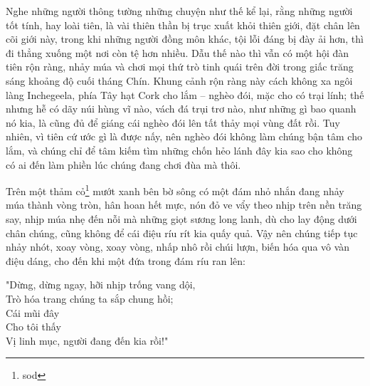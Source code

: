 Nghe những người thông tường những chuyện như thế kể lại, rằng những người tốt tính, hay loài tiên, là vài thiên thần bị trục xuất khỏi thiên giới, đặt chân lên cõi giới này, trong khi những người đồng môn khác, tội lỗi đáng bị đày ải hơn, thì đi thẳng xuống một nơi còn tệ hơn nhiều. Dẫu thế nào thì vẫn có một hội đàn tiên rộn ràng, nhảy múa và chơi mọi thứ trò tinh quái trên đời trong giấc trăng sáng khoảng độ cuối tháng Chín. Khung cảnh rộn ràng này cách không xa ngôi làng Inchegeela, phía Tây hạt Cork cho lắm – nghèo đói, mặc cho có trại lính; thế nhưng hễ có dãy núi hùng vĩ nào, vách đá trụi trơ nào, như những gì bao quanh nó kia, là cũng đủ để giáng cái nghèo đói lên tất thảy mọi vùng đất rồi. Tuy nhiên, vì tiên cứ ước gì là được nấy, nên nghèo đói không làm chúng bận tâm cho lắm, và chúng chỉ để tâm kiếm tìm những chốn hẻo lánh đây kia sao cho không có ai đến làm phiền lúc chúng đang chơi đùa mà thôi.

Trên một thảm cỏ\footnote{sod} mướt xanh bên bờ sông có một đám nhỏ nhắn đang nhảy múa thành vòng tròn, hân hoan hết mực, nón đỏ ve vẩy theo nhịp trên nền trăng say, nhịp múa nhẹ đến nỗi mà những giọt sương long lanh, dù cho lay động dưới chân chúng, cũng không để cái điệu ríu rít kia quấy quả. Vậy nên chúng tiếp tục nhảy nhót, xoay vòng, xoay vòng, nhấp nhô rồi chúi lượn, biến hóa qua vô vàn điệu dáng, cho đến khi một đứa trong đám ríu ran lên:

\begin{center}
  "Dừng, dừng ngay, hỡi nhịp trống vang dội,\\
  Trò hóa trang chúng ta sắp chung hồi;\\
  Cái mũi đây\\
  Cho tôi thấy\\
  Vị linh mục, người đang đến kia rồi!"\\
\end{center}

